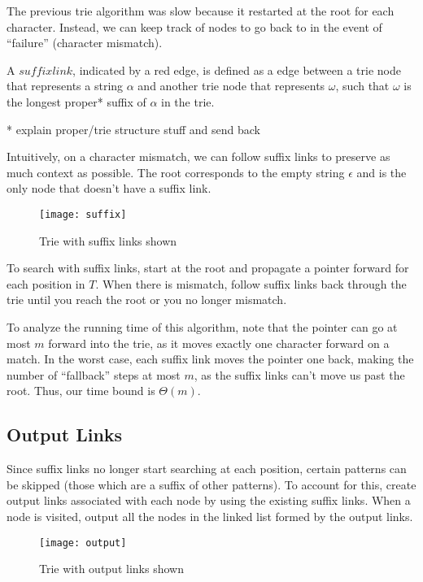 \documentclass[11pt, oneside]{article}
\begin{document}
The previous trie algorithm was slow because it restarted at the root for each character.
Instead, we can keep track of nodes to go back to in the event of ``failure'' (character mismatch).

A \( suffix link \), indicated by a red edge, is defined as a edge between a trie node that represents a string \( \alpha \)
and another trie node that represents \( \omega \), such that \( \omega \)
is the longest proper* suffix of \( \alpha \) in the trie.

* explain proper/trie structure stuff and send back

Intuitively, on a character mismatch, we can follow suffix links to preserve as much context as possible.
The root corresponds to the empty string \( \epsilon \) and is the only node that doesn't have a suffix link.

\begin{figure}[h!]
\centering
\texttt{[image: suffix]}
\caption{Trie with suffix links shown}
\end{figure}

To search with suffix links, start at the root and propagate a pointer
forward for each position in \( T \). When there is mismatch, follow suffix links back through the trie until you reach the root
or you no longer mismatch.

To analyze the running time of this algorithm, note that the pointer can go
at most \( m \) forward into the trie, as it moves exactly one character forward on a match.
In the worst case, each suffix link moves the pointer one back, making the
number of ``fallback'' steps at most \( m \), as the suffix links can't move us past the root.
Thus, our time bound is \( \Theta(m) \).

\newpage

\subsection{Output Links}

Since suffix links no longer start searching at each position,
certain patterns can be skipped (those which are a suffix of other patterns).
To account for this, create output links associated with each node by using
the existing suffix links.
When a node is visited, output all the nodes in the linked list formed by
the output links.

\begin{figure}[h!]
\centering
\texttt{[image: output]}
\caption{Trie with output links shown}
\end{figure}
\end{document}
